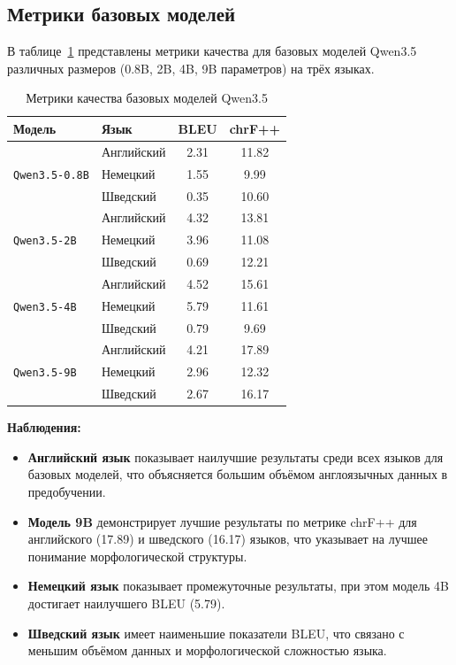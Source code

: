 \documentclass[14pt,a4paper]{extreport}
\begin{document}
\subsection{Метрики базовых моделей}

В таблице~\ref{tab:base_metrics} представлены метрики качества для базовых моделей Qwen3.5 различных размеров (0.8B, 2B, 4B, 9B параметров) на трёх языках.

\begin{table}[H]
\centering
\caption{Метрики качества базовых моделей Qwen3.5}
\label{tab:base_metrics}
\begin{tabular}{|l|l|c|c|}
\hline
\textbf{Модель} & \textbf{Язык} & \textbf{BLEU} & \textbf{chrF++} \\
\hline
\multirow{3}{*}{\texttt{Qwen3.5-0.8B}} & Английский & 2.31 & 11.82 \\
\cline{2-4}
& Немецкий & 1.55 & 9.99 \\
\cline{2-4}
& Шведский & 0.35 & 10.60 \\
\hline
\multirow{3}{*}{\texttt{Qwen3.5-2B}} & Английский & 4.32 & 13.81 \\
\cline{2-4}
& Немецкий & 3.96 & 11.08 \\
\cline{2-4}
& Шведский & 0.69 & 12.21 \\
\hline
\multirow{3}{*}{\texttt{Qwen3.5-4B}} & Английский & 4.52 & 15.61 \\
\cline{2-4}
& Немецкий & 5.79 & 11.61 \\
\cline{2-4}
& Шведский & 0.79 & 9.69 \\
\hline
\multirow{3}{*}{\texttt{Qwen3.5-9B}} & Английский & 4.21 & 17.89 \\
\cline{2-4}
& Немецкий & 2.96 & 12.32 \\
\cline{2-4}
& Шведский & 2.67 & 16.17 \\
\hline
\end{tabular}
\end{table}

\textbf{Наблюдения:}
\begin{itemize}
    \item \textbf{Английский язык} показывает наилучшие результаты среди всех языков для базовых моделей, что объясняется большим объёмом англоязычных данных в предобучении.
    \item \textbf{Модель 9B} демонстрирует лучшие результаты по метрике chrF++ для английского (17.89) и шведского (16.17) языков, что указывает на лучшее понимание морфологической структуры.
    \item \textbf{Немецкий язык} показывает промежуточные результаты, при этом модель 4B достигает наилучшего BLEU (5.79).
    \item \textbf{Шведский язык} имеет наименьшие показатели BLEU, что связано с меньшим объёмом данных и морфологической сложностью языка.
\end{itemize}
\end{document}
